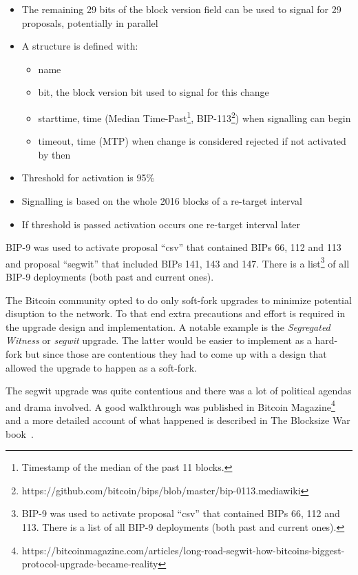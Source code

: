 \begin{itemize}
\item The remaining 29 bits of the block version field can be used to signal for 29 proposals, potentially in parallel
\item A structure is defined with:
	\begin{itemize}
	\item name
	\item bit, the block version bit used to signal for this change
	\item starttime, time (Median Time-Past\footnote{Timestamp of the median of the past 11 blocks.}, BIP-113\footnote{https://github.com/bitcoin/bips/blob/master/bip-0113.mediawiki}) when signalling can begin
	\item timeout, time (MTP) when change is considered rejected if not activated by then
	\end{itemize}
\item Threshold for activation is 95\%
\item Signalling is based on the whole 2016 blocks of a re-target interval
\item If threshold is passed activation occurs one re-target interval later
\end{itemize}

BIP-9 was used to activate proposal ``csv'' that contained BIPs 66, 112 and 113 and proposal ``segwit'' that included BIPs 141, 143 and 147. There is a list\footnote{BIP-9 was used to activate proposal “csv” that contained BIPs 66, 112 and 113. There is a list of all BIP-9 deployments (both past and current ones).} of all BIP-9 deployments (both past and current ones).

\begin{note}
The Bitcoin community opted to do only soft-fork upgrades to minimize potential disuption to the network. To that end extra precautions and effort is required in the upgrade design and implementation. A notable example is the \emph{Segregated Witness} or \emph{segwit} upgrade. The latter would be easier to implement as a hard-fork but since those are contentious they had to come up with a design that allowed the upgrade to happen as a soft-fork. 
\end{note}

The segwit upgrade was quite contentious and there was a lot of political agendas and drama involved. A good walkthrough was published in Bitcoin Magazine\footnote{https://bitcoinmagazine.com/articles/long-road-segwit-how-bitcoins-biggest-protocol-upgrade-became-reality} and a more detailed account of what happened is described in The Blocksize War book~\cite{Bier2021-blocksize-wars}.


